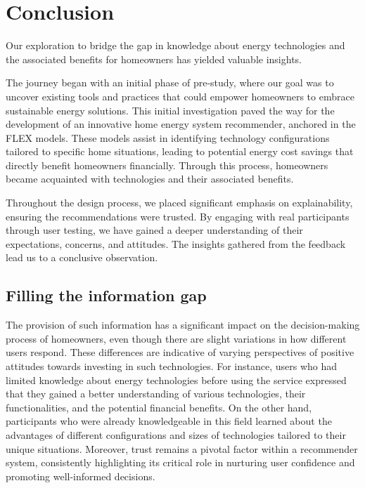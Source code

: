 \chapter{Conclusion}

Our exploration to bridge the gap in knowledge about energy technologies and the associated benefits for homeowners has yielded valuable insights. 

The journey began with an initial phase of pre-study, where our goal was to uncover existing tools and practices that could empower homeowners to embrace sustainable energy solutions. 
This initial investigation paved the way for the development of an innovative home energy system recommender, anchored in the FLEX models. 
These models assist in identifying technology configurations tailored to specific home situations, leading to potential energy cost savings that directly benefit homeowners financially. 
Through this process, homeowners became acquainted with technologies and their associated benefits. 

Throughout the design process, we placed significant emphasis on explainability, ensuring the recommendations were trusted.  
By engaging with real participants through user testing, we have gained a deeper understanding of their expectations, concerns, and attitudes. 
The insights gathered from the feedback lead us to a conclusive observation.


\section{Filling the information gap}

The provision of such information has a significant impact on the decision-making process of homeowners, even though there are slight variations in how different users respond. 
These differences are indicative of varying perspectives of positive attitudes towards investing in such technologies. 
For instance, users who had limited knowledge about energy technologies before using the service expressed that they gained a better understanding of various technologies, their functionalities, and the potential financial benefits.
On the other hand, participants who were already knowledgeable in this field learned about the advantages of different configurations and sizes of technologies tailored to their unique situations.
Moreover, trust remains a pivotal factor within a recommender system, consistently highlighting its critical role in nurturing user confidence and promoting well-informed decisions.


